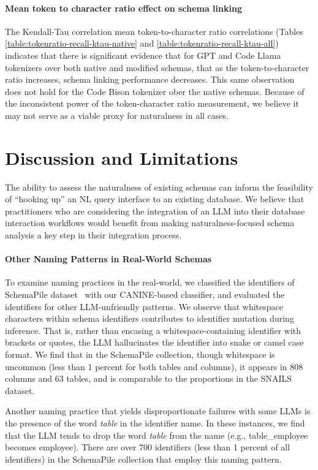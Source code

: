 \paragraph{\textbf{Mean token to character ratio effect on schema linking}}

The Kendall-Tau correlation mean token-to-character ratio correlations (Tables \ref{table:tokenratio-recall-ktau-native} and \ref{table:tokenratio-recall-ktau-all}) indicates that there is significant evidence that for GPT and Code Llama tokenizers over both native and modified schemas, that as the token-to-character ratio increases, schema linking performance decreases.
This same observation does not hold for the Code Bison tokenizer ober the native schemas.
Because of the inconsistent power of the token-character ratio measurement, we believe it may not serve as a viable proxy for naturalness in all cases.


\section{Discussion and Limitations}


The ability to assess the naturalness of existing schemas can inform the feasibility of ``hooking up'' an NL query interface to an existing database.
We believe that practitioners who are considering the integration of an LLM into their database interaction workflows would benefit from making naturalness-focused schema analysis a key step in their integration process.

\paragraph{\textbf{Other Naming Patterns in Real-World Schemas}}
To examine naming practices in the real-world, we classified the identifiers of SchemaPile dataset~\cite{doehmen2024schemapile} with our CANINE-based classifier, and evaluated the identifiers for other LLM-unfriendly patterns.
We observe that whitespace characters within schema identifiers contributes to identifier mutation during inference.
That is, rather than encasing a whitespace-containing identifier with brackets or quotes, the LLM hallucinates the identifier into snake or camel case format.
We find that in the SchemaPile collection, though whitespace is uncommon (less than 1 percent for both tables and columns), it appears in 808 columns and 63 tables, and is comparable to the proportions in the SNAILS dataset.

Another naming practice that yields disproportionate failures with some LLMs is the presence of the word \emph{table} in the identifier name.
In these instances, we find that the LLM tends to drop the word \emph{table} from the name (e.g., table\_employee becomes employee).
There are over 700 identifiers (less than 1 percent of all identifiers) in the SchemaPile collection that employ this naming pattern.

